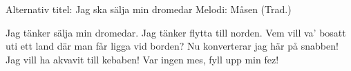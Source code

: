 \begin{song}

\begin{songmeta}
Alternativ titel: Jag ska sälja min dromedar
Melodi: Måsen (Trad.)
\end{songmeta}

\begin{songtext}
Jag tänker sälja min dromedar.
Jag tänker flytta till norden.
Vem vill va' bosatt uti ett land
där man får ligga vid borden?
Nu konverterar jag här på snabben!
Jag vill ha akvavit till kebaben!
Var ingen mes, fyll upp min fez!
\end{songtext}

\end{song}
